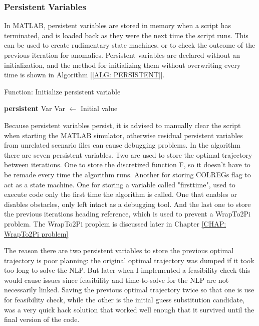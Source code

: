 \subsubsection*{Persistent Variables}
In MATLAB, persistent variables are stored in memory when a script has terminated, and is loaded back as they were the next
time the script runs. This can be used to create rudimentary state machines, or to check the outcome of the previous iteration for anomalies.
Persistent variables are declared without an initialization, and the method for initializing them without overwriting every time is shown in Algorithm [\ref{ALG: PERSISTENT}].

\begin{algorithm}[ht]
    \caption{Function: Initialize persistent variable} \label{ALG: PERSISTENT}
    \begin{algorithmic}
        \State \textbf{persistent} Var
            \State Var $\gets$ Initial value
        \EndIf
    \end{algorithmic}
\end{algorithm}

Because persistent variables persist, it is advised to manually clear the script when starting the MATLAB simulator, otherwise
residual persistent variables from unrelated scenario files can cause debugging problems. In the algorithm there are seven
persistent variables. Two are used to store the optimal trajectory between iterations. One to store the discretized function F, so it doesn't have to be
remade every time the algorithm runs. Another for storing COLREGs flag to act as a state machine. One for storing a variable called "firsttime", 
used to execute code only the first time the algorithm is called. One that enables or disables obstacles, 
only left intact as a debugging tool. And the last one to store the previous iterations heading reference, which is used to prevent a
WrapTo2Pi problem. The WrapTo2Pi proplem is discussed later in Chapter \ref{CHAP: WrapTo2Pi problem}

The reason there are two persistent variables to store the previous optimal trajectory is poor planning:
the original optimal trajectory was dumped if it took too long to solve the NLP. 
But later when I implemented a feasibility check this would cause issues since feasibility and time-to-solve for the NLP are not necessarily linked.
Saving the previous optimal trajectory twice so that one is use for feasibility check, while the other is the initial guess substitution candidate,
was a very quick hack solution that worked well enough that it survived until the final version of the code.


